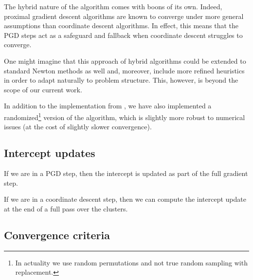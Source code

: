 \documentclass[article]{jss}
\begin{document}
%
%
%
%
%
%
%
%

The hybrid nature of the algorithm comes with boons of its own.
Indeed, proximal gradient descent algorithms are known to converge under
more general assumptions than coordinate descent algorithms. In effect,
this means that the PGD steps act as a safeguard and fallback
when coordinate descent struggles to converge.

One might imagine that this approach of hybrid algorithms could be
extended to standard Newton methods as well and, moreover, include more
refined heuristics in order to adapt naturally to problem structure.
This, however, is beyond the scope of our current work.

In addition to the implementation from \citet{larsson2023}, we have also
implemented a randomized\footnote{In actuality we use random permutations and
  not true random sampling with replacement.} version of the algorithm, which is
slightly more robust to numerical issues (at the cost of slightly slower
convergence).

\subsection{Intercept updates}

If we are in a PGD step, then the intercept is updated as part of the
full gradient step.

If we are in a coordinate descent step, then we can compute the intercept
update at the end of a full pass over the clusters.

\subsection{Convergence criteria}
\end{document}

